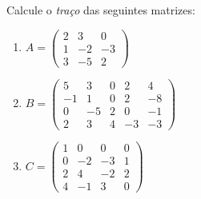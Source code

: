 \documentclass[12pt]{exam}
\begin{document}
    \vspace{.3cm}

    \questao{} Calcule o \textit{traço} das seguintes matrizes:
    \begin{enumerate}
        \item $A = \begin{pmatrix}2 & 3 & 0\\1 & -2 & -3\\3 & -5 & 2\end{pmatrix}$
        \item $B = \begin{pmatrix}5 & 3 & 0 & 2 & 4\\-1 & 1 & 0 & 2 & -8\\0 & -5 & 2 & 0 & -1\\2 & 3 & 4 & -3 & -3\end{pmatrix}$
        \item $C = \begin{pmatrix}1 & 0 & 0 & 0\\0 & -2 & -3 & 1\\2 & 4 & -2 & 2\\4 & -1 & 3 & 0\end{pmatrix}$
    \end{enumerate}
\end{document}
